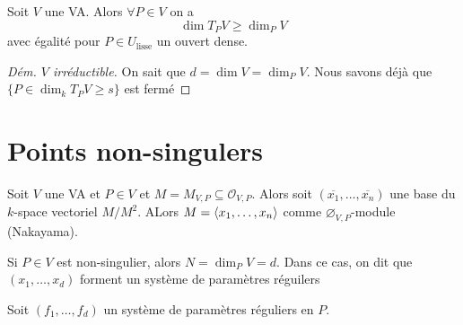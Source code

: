 \begin{theorem}{}
    Soit \(V\) une VA. Alors \(\forall P \in V\) on a
    \[
      \dim T_P V \ge \dim_P V
    \]
    avec égalité pour \(P \in U_\text{lisse} \) un ouvert dense.
\end{theorem}
\begin{proof}[Dém. \(V\) irréductible]
    On sait que \(d = \dim V = \dim_P V\). Nous savons déjà que \(\{P \in \dim_k
    T_P V \ge s\} \) est fermé
\end{proof}

\section{Points non-singulers}
Soit \(V\) une VA et \(P \in V\) et \(M = M_{V, P} \subseteq \mathcal{O}_{V, P}
\). Alors soit \({(\overline{x_{1}}, \dots,
\overline{x_{n}})}\) une base du \(k\)-space vectoriel \(M / M^2\). ALors \(M =
{\left\langle x_{1}, \dots, x_{n}\right\rangle} \) comme \(\varnothing_{V, P} \)-module (Nakayama).

Si \(P \in V\) est non-singulier, alors \(N = \dim_P V = d\). Dans ce cas, on
dit que \({(x_{1}, \dots, x_d)}\) forment un système de paramètres réguilers

\begin{lemma}[p. 37]
    Soit \({(f_{1}, \dots, f_d)}\) un système de paramètres réguliers en \(P\).
\end{lemma}



